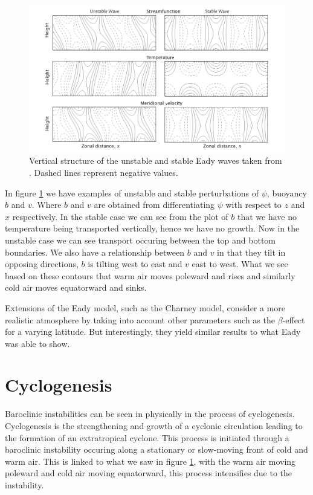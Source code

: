 \documentclass[a4paper,12pt]{article}
\begin{document}
\begin{figure}
  \centering
  \includegraphics[width=\textwidth]{growthrates.png}
  \caption{Vertical structure of the unstable and stable Eady waves taken from \cite{Vallis2019}. Dashed lines represent negative values.} 
  \label{growthpicture}
\end{figure}
In figure \ref{growthpicture} we have examples of unstable and stable perturbations of $\psi$, buoyancy $b$ and $v$. Where $b$ and $v$ are obtained from differentiating $\psi$ with respect to $z$ and $x$ respectively. In the stable case we can see from the plot of $b$ that we have no temperature being transported vertically, hence we have no growth. Now in the unstable case we can see transport occuring between the top and bottom boundaries. We also have a relationship between $b$ and $v$ in that they tilt in opposing directions, $b$ is tilting west to east and $v$ east to west. What we see based on these contours that warm air moves poleward and rises and similarly cold air moves equatorward and sinks. 

Extensions of the Eady model, such as the Charney model, consider a more realistic atmosphere by taking into account other parameters such as the $\beta$-effect for a varying latitude. But interestingly, they yield similar results to what Eady was able to show. 
\newpage
\section{Cyclogenesis} 
Baroclinic instabilities can be seen in physically in the process of cyclogenesis. Cyclogenesis is the strengthening and growth of a cyclonic circulation leading to the formation of an extratropical cyclone. This process is initiated through a baroclinic instability occuring along a stationary or slow-moving front of cold and warm air. This is linked to what we saw in figure \ref{growthpicture}, with the warm air moving poleward and cold air moving equatorward, this process intensifies due to the instability.
\end{document}
